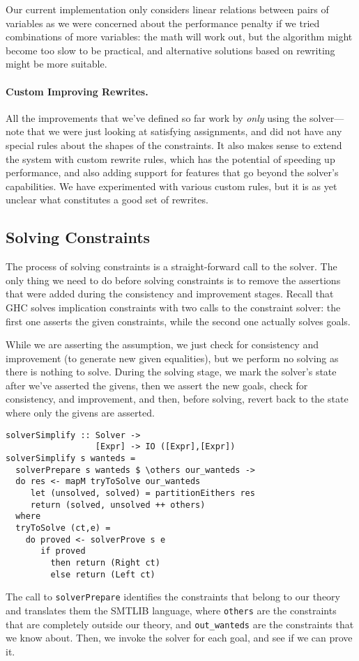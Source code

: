 \documentclass{sigplanconf}
\begin{document}
Our current implementation only considers linear relations between pairs
of variables as we were concerned about the performance penalty if
we tried combinations of more variables: the math will work out, but
the algorithm might become too slow to be practical, and alternative
solutions based on rewriting might be more suitable.


\paragraph{Custom Improving Rewrites.}
All the improvements that we've defined so far work by {\em only} using
the solver---note that we were just looking at satisfying assignments,
and did not have any special rules about the shapes of the constraints.
It also makes sense to extend the system with custom rewrite rules,
which has the potential of speeding up performance, and also adding
support for features that go beyond the solver's capabilities.
We have experimented with various custom rules, but it is as yet
unclear what constitutes a good set of rewrites.


\subsection{Solving Constraints}

The process of solving constraints is a straight-forward call to the
solver.  The only thing we need to do before solving constraints is
to remove the assertions that were added during the consistency and
improvement stages.  Recall that GHC solves implication constraints
with two calls to the constraint solver: the first one asserts
the given constraints, while the second one actually solves goals.

While we are asserting the assumption, we just check for consistency
and improvement (to generate new given equalities), but we perform
no solving as there is nothing to solve.  During the solving stage,
we mark the solver's state after we've asserted the givens,
then we assert the new goals, check for consistency, and improvement,
and then, before solving, revert back to the state where only
the givens are asserted.
\begin{Verbatim}
solverSimplify :: Solver ->
                  [Expr] -> IO ([Expr],[Expr])
solverSimplify s wanteds =
  solverPrepare s wanteds $ \others our_wanteds ->
  do res <- mapM tryToSolve our_wanteds
     let (unsolved, solved) = partitionEithers res
     return (solved, unsolved ++ others)
  where
  tryToSolve (ct,e) =
    do proved <- solverProve s e
       if proved
         then return (Right ct)
         else return (Left ct)
\end{Verbatim}
The call to \verb"solverPrepare" identifies the constraints that belong
to our theory and translates them the SMTLIB language, where \Verb"others"
are the constraints that are completely outside our theory, and
\Verb"out_wanteds" are the constraints that we know about. Then,
we invoke the solver for each goal, and see if we can prove it.
\end{document}
